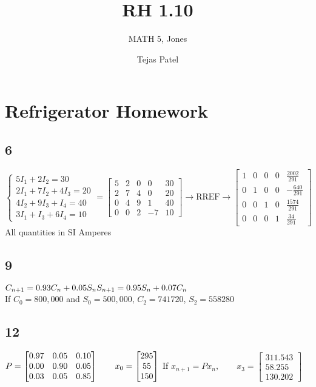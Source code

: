 \documentclass{article}
\title{RH 1.10}
\author{MATH 5, Jones}
\date{Tejas Patel}
\begin{document}
\maketitle
\section*{Refrigerator Homework}
\subsection*{6}
$\begin{cases}
  5I_1 + 2I_2 = 30 \\
  2I_1 + 7I_2 + 4I_3 = 20 \\
  4I_2 + 9I_3 + I_4 = 40 \\
  3I_1 + I_3 + 6I_4 = 10
  \end{cases} = \begin{bmatrix}
    5&2&0&0&30\\2&7&4&0&20\\0&4&9&1&40\\0&0&2&-7&10
  \end{bmatrix}\rightarrow \text{RREF} \rightarrow \begin{bmatrix} 1 & 0 & 0 & 0 & \frac{2002}{291} \\[0.1in] 0 & 1 & 0 & 0 & -\frac{640}{291} \\[0.1in] 0 & 0 & 1 & 0 & \frac{1574}{291} \\[0.1in] 0 & 0 & 0 & 1 & \frac{34}{291} \end{bmatrix}$ All quantities in SI Amperes
\subsection*{9}
$C_{n+1} = 0.93C_n + 0.05S_n \\ 
S_{n+1} = 0.95S_n + 0.07C_n$
\\If $C_0=800,000$ and $S_0=500,000$, $C_2=741720$, $S_2=558280$ 
\subsection*{12}

$P = \begin{bmatrix}
  0.97 & 0.05 & 0.10 \\
  0.00 & 0.90 & 0.05 \\
  0.03 & 0.05 & 0.85
  \end{bmatrix} \qquad 
  x_0 = \begin{bmatrix} 295 \\ 55 \\ 150 \end{bmatrix} \\[0.1in] 
$ If $  x_{n+1} = P x_n, \qquad x_3=\begin{bmatrix}
  311.543\\  58.255\\ 130.202
\end{bmatrix}$

  
   
\end{document}
